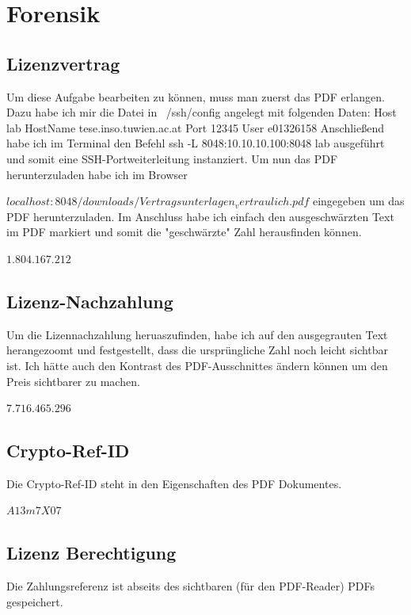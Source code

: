 \documentclass[12pt,a4paper,titlepage,oneside]{scrartcl}
\begin{document}
\section{Forensik}

\subsection{Lizenzvertrag}
Um diese Aufgabe bearbeiten zu können, muss man zuerst das PDF erlangen.
Dazu habe ich mir die Datei in ~/ssh/config angelegt mit folgenden Daten:
\newline
\newline
Host lab \newline
HostName tese.inso.tuwien.ac.at \newline
Port 12345 \newline
User e01326158
\newline
\newline
Anschließend habe ich im Terminal den Befehl ssh -L 8048:10.10.10.100:8048 lab ausgeführt und somit eine SSH-Portweiterleitung instanziert.
Um nun das PDF herunterzuladen habe ich im Browser

$localhost:8048/downloads/Vertragsunterlagen_vertraulich.pdf$
\newline
\newline
eingegeben um das PDF herunterzuladen. Im Anschluss habe ich einfach den ausgeschwärzten Text im PDF markiert und somit die "geschwärzte" Zahl herausfinden können.

$1.804.167.212$


\subsection{Lizenz-Nachzahlung}
Um die Lizennachzahlung heruaszufinden, habe ich auf den ausgegrauten Text herangezoomt und festgestellt, dass die ursprüngliche Zahl noch leicht sichtbar ist. Ich hätte auch den Kontrast des PDF-Ausschnittes ändern können um den Preis sichtbarer zu machen.

$7.716.465.296$

\subsection{Crypto-Ref-ID}
Die Crypto-Ref-ID steht in den Eigenschaften des PDF Dokumentes.

$A13m7X07$

\subsection{Lizenz Berechtigung}
Die Zahlungsreferenz ist abseits des sichtbaren (für den PDF-Reader) PDFs gespeichert.
\end{document}
